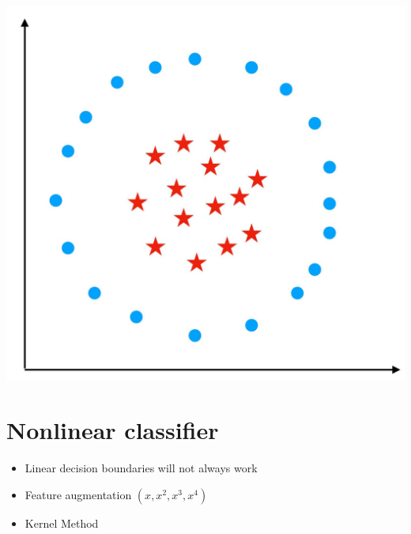 \documentclass[10pt]{article}
\begin{document}
\begin{center}
\includegraphics[max width=\textwidth]{2023_12_30_cf784c471dfd1dd5afbag-25}
\end{center}

\section*{Nonlinear classifier}
\begin{itemize}
  \item Linear decision boundaries will not always work

  \item Feature augmentation $\left(x, x^{2}, x^{3}, x^{4}\right)$

  \item Kernel Method

\end{itemize}
\end{document}
